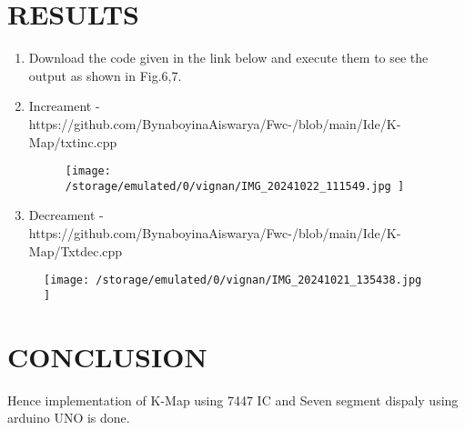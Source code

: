 \documentclass[conference]{IEEEtran}
\begin{document}
\section{RESULTS}
 \begin{enumerate}
	 \item Download the code given in the link below and execute them to see the output as shown in Fig.6,7. 
	 \item Increament - https://github.com/BynaboyinaAiswarya/Fwc-/blob/main/Ide/K-Map/txtinc.cpp\\



		 \begin{figure}[h]                           
\centering                                 
\texttt{[image:   /storage/emulated/0/vignan/IMG\_20241022\_111549.jpg   ]}                                           
\caption{\label{fig-5:Gates}}               
\end{figure}

	 \item Decreament - https://github.com/BynaboyinaAiswarya/Fwc-/blob/main/Ide/K-Map/Txtdec.cpp\\
 \end{enumerate}                             



\begin{figure}[h]                        
\centering                          
\texttt{[image: /storage/emulated/0/vignan/IMG\_20241021\_135438.jpg  ]}                                  
\caption{\label{fig-6:Gates}}        
\end{figure}

\section{CONCLUSION}
 Hence implementation of K-Map using 7447 IC and Seven segment dispaly using arduino UNO is done.
\end{document}
